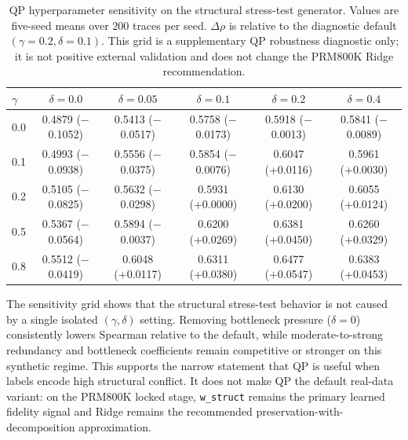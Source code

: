 \documentclass[a4paper,fleqn]{cas-sc}
\begin{document}
\begin{table}[ht]
\caption{QP hyperparameter sensitivity on the structural stress-test generator. Values are five-seed means over 200 traces per seed. $\Delta\rho$ is relative to the diagnostic default $(\gamma=0.2,\delta=0.1)$. This grid is a supplementary QP robustness diagnostic only; it is not positive external validation and does not change the PRM800K Ridge recommendation.}
\label{tab:supp-gamma-delta-sensitivity}
\centering
\small
\begin{tabular}{lccccc}
\toprule
\textbf{$\gamma$} & \textbf{$\delta=0.0$} & \textbf{$\delta=0.05$} & \textbf{$\delta=0.1$} & \textbf{$\delta=0.2$} & \textbf{$\delta=0.4$} \\
\midrule
0.0 & 0.4879 ($-$0.1052) & 0.5413 ($-$0.0517) & 0.5758 ($-$0.0173) & 0.5918 ($-$0.0013) & 0.5841 ($-$0.0089) \\
0.1 & 0.4993 ($-$0.0938) & 0.5556 ($-$0.0375) & 0.5854 ($-$0.0076) & 0.6047 (+0.0116) & 0.5961 (+0.0030) \\
0.2 & 0.5105 ($-$0.0825) & 0.5632 ($-$0.0298) & 0.5931 (+0.0000) & 0.6130 (+0.0200) & 0.6055 (+0.0124) \\
0.5 & 0.5367 ($-$0.0564) & 0.5894 ($-$0.0037) & 0.6200 (+0.0269) & 0.6381 (+0.0450) & 0.6260 (+0.0329) \\
0.8 & 0.5512 ($-$0.0419) & 0.6048 (+0.0117) & 0.6311 (+0.0380) & 0.6477 (+0.0547) & 0.6383 (+0.0453) \\
\bottomrule
\end{tabular}
\end{table}

The sensitivity grid shows that the structural stress-test behavior is not caused by a single isolated $(\gamma,\delta)$ setting. Removing bottleneck pressure ($\delta=0$) consistently lowers Spearman relative to the default, while moderate-to-strong redundancy and bottleneck coefficients remain competitive or stronger on this synthetic regime. This supports the narrow statement that QP is useful when labels encode high structural conflict. It does not make QP the default real-data variant: on the PRM800K locked stage, \texttt{w\_struct} remains the primary learned fidelity signal and Ridge remains the recommended preservation-with-decomposition approximation.
\end{document}
